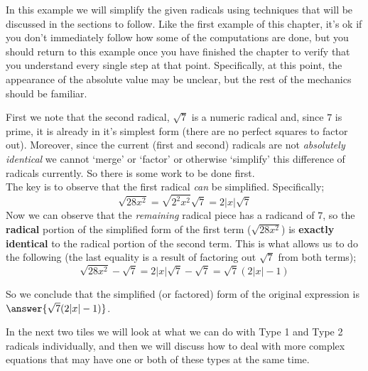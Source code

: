 \documentclass{ximera}
\begin{document}
    \begin{example}%
        In this example we will simplify the given radicals using techniques that will be discussed in the sections to follow. Like the first example of this chapter, it's ok if you don't immediately follow how some of the computations are done, but you should return to this example once you have finished the chapter to verify that you understand every single step at that point. Specifically, at this point, the appearance of the absolute value may be unclear, but the rest of the mechanics should be familiar.

        First we note that the second radical, $\sqrt{7}$ is a numeric radical and, since $7$ is prime, it is already in it's simplest form (there are no perfect squares to factor out). Moreover, since the current (first and second) radicals are not \textit{absolutely identical} we cannot `merge' or `factor' or otherwise `simplify' this difference of radicals currently. So there is some work to be done first. \\
        The key is to observe that the first radical \textit{can} be simplified. Specifically; 
        \[
            \sqrt{28x^2} = \sqrt{2^2 x^2}\sqrt{7} = 2|x|\sqrt{7} 
        \]
        Now we can observe that the \textit{remaining} radical piece has a radicand of $7$, so the \textbf{radical} portion of the simplified form of the first term ($\sqrt{28x^2}$) is \textbf{exactly identical} to the radical portion of the second term. This is what allows us to do the following (the last equality is a result of factoring out $\sqrt{7}$ from both terms);
        \[
            \sqrt{28x^2} - \sqrt{7} = 2|x|\sqrt{7} - \sqrt{7} = \sqrt{7}(2|x| - 1)
        \]

        So we conclude that the simplified (or factored) form of the original expression is $\answer{\sqrt{7}(2|x| - 1)}$.
    \end{example}%

In the next two tiles we will look at what we can do with Type 1 and Type 2 radicals individually, and then we will discuss how to deal with more complex equations that may have one or both of these types at the same time.
\end{document}
